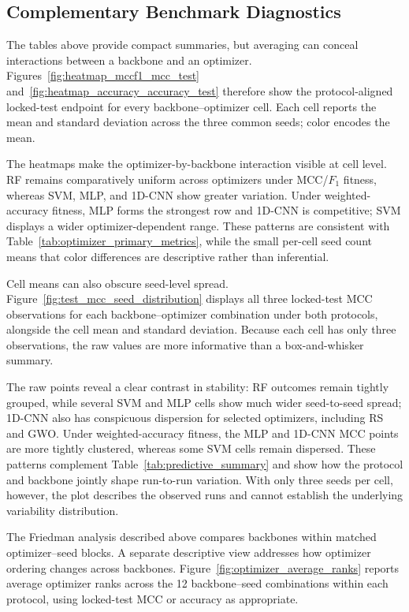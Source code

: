 \subsection{Complementary Benchmark Diagnostics}
\label{sec:benchmark_diagnostics}

The tables above provide compact summaries, but averaging can conceal interactions between a backbone and an optimizer. Figures~\ref{fig:heatmap_mccf1_mcc_test} and~\ref{fig:heatmap_accuracy_accuracy_test} therefore show the protocol-aligned locked-test endpoint for every backbone--optimizer cell. Each cell reports the mean and standard deviation across the three common seeds; color encodes the mean.

The heatmaps make the optimizer-by-backbone interaction visible at cell level. RF remains comparatively uniform across optimizers under MCC/$F_1$ fitness, whereas SVM, MLP, and 1D-CNN show greater variation. Under weighted-accuracy fitness, MLP forms the strongest row and 1D-CNN is competitive; SVM displays a wider optimizer-dependent range. These patterns are consistent with Table~\ref{tab:optimizer_primary_metrics}, while the small per-cell seed count means that color differences are descriptive rather than inferential.

Cell means can also obscure seed-level spread. Figure~\ref{fig:test_mcc_seed_distribution} displays all three locked-test MCC observations for each backbone--optimizer combination under both protocols, alongside the cell mean and standard deviation. Because each cell has only three observations, the raw values are more informative than a box-and-whisker summary.

The raw points reveal a clear contrast in stability: RF outcomes remain tightly grouped, while several SVM and MLP cells show much wider seed-to-seed spread; 1D-CNN also has conspicuous dispersion for selected optimizers, including RS and GWO. Under weighted-accuracy fitness, the MLP and 1D-CNN MCC points are more tightly clustered, whereas some SVM cells remain dispersed. These patterns complement Table~\ref{tab:predictive_summary} and show how the protocol and backbone jointly shape run-to-run variation. With only three seeds per cell, however, the plot describes the observed runs and cannot establish the underlying variability distribution.

The Friedman analysis described above compares backbones within matched optimizer--seed blocks. A separate descriptive view addresses how optimizer ordering changes across backbones. Figure~\ref{fig:optimizer_average_ranks} reports average optimizer ranks across the 12 backbone--seed combinations within each protocol, using locked-test MCC or accuracy as appropriate.


